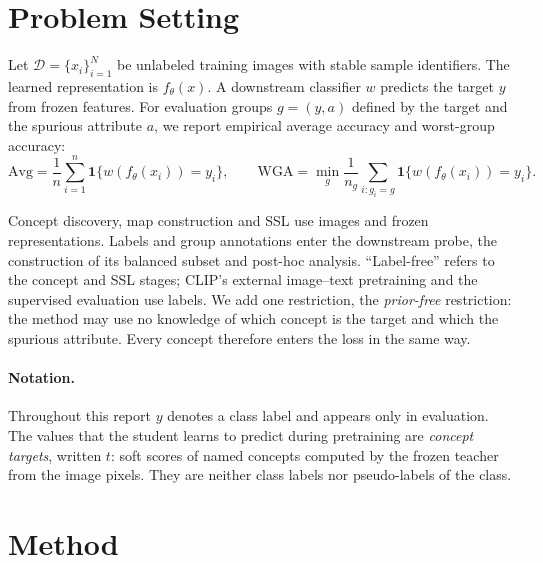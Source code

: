 \documentclass{article}
\begin{document}
\section{Problem Setting}
Let $\mathcal{D}=\{x_i\}_{i=1}^{N}$ be unlabeled training images with stable sample identifiers. The learned representation is $f_\theta(x)$. A downstream classifier $w$ predicts the target $y$ from frozen features. For evaluation groups $g=(y,a)$ defined by the target and the spurious attribute $a$, we report empirical average accuracy and worst-group accuracy:
\begin{equation}
 \mathrm{Avg}=\frac{1}{n}\sum_{i=1}^{n}\mathbf{1}\{w(f_\theta(x_i))=y_i\},\qquad
 \mathrm{WGA}=\min_g\frac{1}{n_g}\sum_{i:g_i=g}\mathbf{1}\{w(f_\theta(x_i))=y_i\}.
\end{equation}

Concept discovery, map construction and SSL use images and frozen representations. Labels and group annotations enter the downstream probe, the construction of its balanced subset and post-hoc analysis. ``Label-free'' refers to the concept and SSL stages; CLIP's external image--text pretraining and the supervised evaluation use labels. We add one restriction, the \emph{prior-free} restriction: the method may use no knowledge of which concept is the target and which the spurious attribute. Every concept therefore enters the loss in the same way.

\paragraph{Notation.} Throughout this report $y$ denotes a class label and appears only in evaluation. The values that the student learns to predict during pretraining are \emph{concept targets}, written $t$: soft scores of named concepts computed by the frozen teacher from the image pixels. They are neither class labels nor pseudo-labels of the class.

\section{Method}
\end{document}
